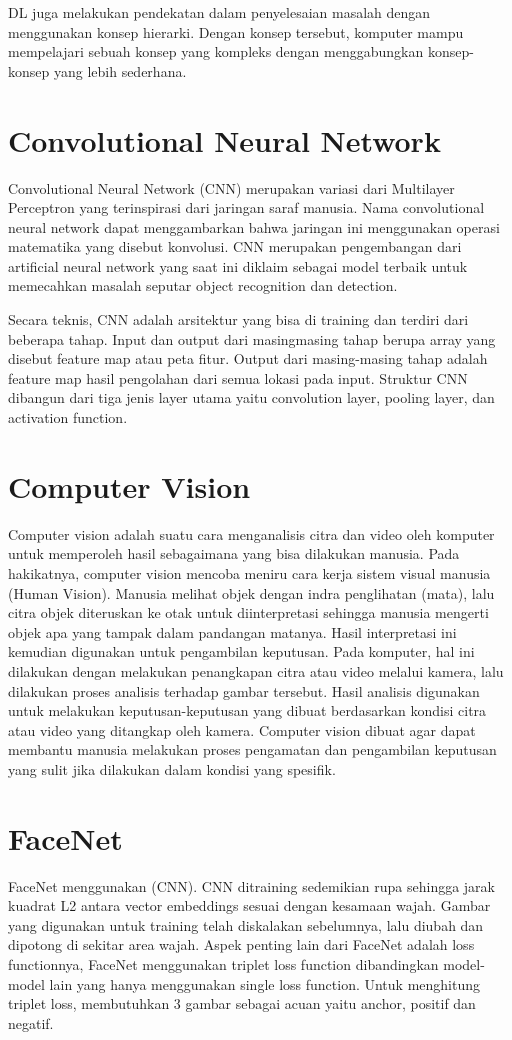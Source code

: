DL juga melakukan pendekatan dalam penyelesaian masalah dengan menggunakan konsep hierarki.
Dengan konsep tersebut, komputer mampu mempelajari sebuah konsep yang kompleks dengan menggabungkan
konsep-konsep yang lebih sederhana.

\section{Convolutional Neural Network}
Convolutional Neural Network (CNN) merupakan variasi dari Multilayer Perceptron yang terinspirasi dari jaringan saraf manusia.
Nama convolutional neural network dapat menggambarkan bahwa jaringan ini menggunakan operasi matematika yang disebut konvolusi.
CNN merupakan pengembangan dari artificial neural network yang saat ini diklaim sebagai model terbaik untuk memecahkan masalah
seputar object recognition dan detection.

Secara teknis, CNN adalah arsitektur yang bisa di training
dan terdiri dari beberapa tahap. Input dan output dari masingmasing tahap berupa array yang disebut feature map atau peta
fitur. Output dari masing-masing tahap adalah feature map hasil pengolahan dari semua lokasi pada input. Struktur CNN dibangun
dari tiga jenis layer utama yaitu convolution layer, pooling layer, dan activation function.

\section{Computer Vision}
Computer vision adalah suatu cara menganalisis citra dan video oleh komputer untuk memperoleh hasil sebagaimana yang bisa dilakukan manusia.
Pada hakikatnya, computer vision mencoba meniru cara kerja sistem visual manusia (Human Vision). Manusia melihat objek dengan indra penglihatan (mata),
lalu citra objek diteruskan ke otak untuk diinterpretasi sehingga manusia mengerti objek apa yang tampak dalam pandangan matanya.
Hasil interpretasi ini kemudian digunakan untuk pengambilan keputusan.
Pada komputer, hal ini dilakukan dengan melakukan penangkapan citra atau video melalui kamera, lalu dilakukan proses analisis terhadap gambar tersebut.
Hasil analisis digunakan untuk melakukan keputusan-keputusan yang dibuat berdasarkan kondisi
citra atau video yang ditangkap oleh kamera. Computer vision dibuat agar dapat membantu manusia melakukan proses pengamatan
dan pengambilan keputusan yang sulit jika dilakukan dalam kondisi
yang spesifik.

\section{FaceNet}
FaceNet menggunakan (CNN). CNN ditraining sedemikian rupa sehingga jarak kuadrat L2 antara vector embeddings sesuai dengan kesamaan wajah.
Gambar yang digunakan untuk training telah diskalakan sebelumnya, lalu diubah dan dipotong di sekitar area wajah.
Aspek penting lain dari FaceNet adalah loss functionnya, FaceNet menggunakan triplet loss function dibandingkan model-model lain yang hanya menggunakan single loss function.
Untuk menghitung triplet loss, membutuhkan 3 gambar sebagai acuan yaitu anchor, positif dan negatif.

